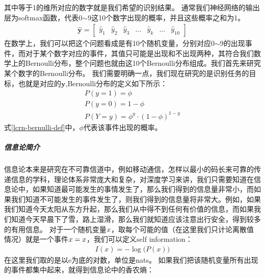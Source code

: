\documentclass[UTF8]{article}
\begin{document}
其中等于1的维所对应的数字就是我们希望的识别结果。\newline
通常我们神经网络的输出层为softmax函数，代表0$\sim$9这10个数字出现的概率，并且这些概率之和为1。
\begin{equation}
\begin{aligned}
\hat{\boldsymbol{y}}=\begin{bmatrix}
\hat{y}_1 & \hat{y}_2 & \hat{y}_3 & ... & \hat{y}_k & ...& \hat{y}_{10}
\end{bmatrix}
\end{aligned}
\label{lcrg-mnist-y-hat-def}
\end{equation}
在数学上，我们可以把这个问题看成是有10个随机变量，分别对应0$\sim$9的出现事件，而对于某个数字对应的事件，其值只可能是出现和不出现两种，其符合我们数学上的Bernoulli分布，整个问题也就由这10个Bernoulli分布组成。我们首先来研究某个数字的Bernoulli分布。\newline
我们需要明确一点，我们现在研究的是识别任务的目标，也就是对应的$\boldsymbol{y}$,Bernoulli分布的定义如下所示：
\begin{equation}
\begin{aligned}
P(y=1)=\phi \\
P(y=0)=1-\phi \\
P(Y=y)=\phi^y \cdot (1-\phi)^{1-y}
\end{aligned}
\label{lcrn-bernulli-def}
\end{equation}
式\ref{lcrn-bernulli-def}中，$\phi$代表该事件出现的概率。
\subparagraph{信息论简介}
信息论本来是研究在不可靠信道中，例如移动通信，怎样以最小的码长来可靠的传递信息的学科，理论体系非常庞大和复杂，对深度学习来讲，我们只需要知道在信息论中，如果知道最可能发生的事情发生了，那么我们得到的信息量非常小，而如果我们知道不可能发生的事件发生了，则我们得到的信息量将非常大。例如，如果我们知道今天太阳从东方升起，那么我们从中得不到任何有价值的信息，而如果我们知道今天早晨下了雪，路上湿滑，那么我们就知道应该注意出行安全，得到较多的有用信息。\newline
对于一个随机变量$\boldmath{x}$，取每个可能的值（在这里我们只计论离散值情况）就是一个事件$\boldmath{x}=x$，我们可以定义self information：
\begin{equation}
\begin{aligned}
I(x)=-\log\big( P(x) \big)
\end{aligned}
\label{lcrn-self-information-def}
\end{equation}
在这里我们取的是以e为底的对数，单位是nats。\newline
如果我们把该随机变量所有出现的事件都集中起来，就得到信息论中的香农熵：
\end{document}
